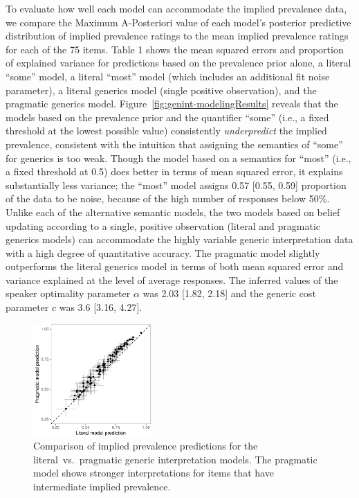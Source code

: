 \documentclass[floatsintext,doc]{apa6}
\begin{document}
To evaluate how well each model can accommodate the implied prevalence data, we compare the Maximum A-Posteriori value of each model's posterior predictive distribution of implied prevalence ratings to the mean implied prevalence ratings for each of the 75 items.
Table 1 shows the mean squared errors and proportion of explained variance for predictions based on the prevalence prior alone, a literal \enquote{some} model, a literal \enquote{most} model (which includes an additional fit noise parameter), a literal generics model (single positive observation), and the pragmatic generics model.
Figure~\ref{fig:genint-modelingResults} reveals that the models based on the prevalence prior and the quantifier \enquote{some} (i.e., a fixed threshold at the lowest possible value) consistently \emph{underpredict} the implied prevalence, consistent with the intuition that assigning the semantics of \enquote{some} for generics is too weak.
Though the model based on a semantics for \enquote{most} (i.e., a fixed threshold at 0.5) does better in terms of mean squared error, it explains substantially less variance; the \enquote{most} model assigns 0.57 {[}0.55, 0.59{]} proportion of the data to be noise, because of the high number of responses below 50\%.
Unlike each of the alternative semantic models, the two models based on belief updating according to a single, positive observation (literal and pragmatic generics models) can accommodate the highly variable generic interpretation data with a high degree of quantitative accuracy.
The pragmatic model slightly outperforms the literal generics model in terms of both mean squared error and variance explained at the level of average responses.
The inferred values of the speaker optimality parameter \(\alpha\) was 2.03 {[}1.82, 2.18{]} and the generic cost parameter \(c\) was 3.6 {[}3.16, 4.27{]}.

\begin{figure}
\centering 
\includegraphics[width=0.4\textwidth]{genint_files/figure-latex/genint-litPrag-scatter-1} 
\caption{Comparison of implied prevalence predictions for the literal~vs.~pragmatic generic interpretation models. The pragmatic model shows stronger interpretations for items that have intermediate implied prevalence.}
\label{fig:genint-litPrag-scatter}
\end{figure}
\end{document}
